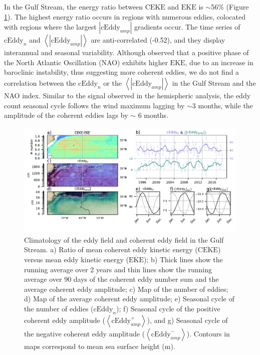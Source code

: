 \documentclass[draft,linenumbers]{agujournal2019}
\newcommand{\MEKE}{\overline{\textrm{EKE}}}
\newcommand{\EKE}{\textrm{EKE}}
\newcommand{\MCEKE}{\overline{\textrm{CEKE}}}
\newcommand{\CEKE}{\textrm{CEKE}}
\newcommand{\cEddy}{\textrm{cEddy}}
\begin{document}
	In the Gulf Stream, the energy ratio between $\CEKE$ and $\EKE$ is $\sim$56\% (Figure \ref{fig:Gulf_Stream}). 
	The highest energy ratio occurs in regions with numerous eddies, colocated with regions where the largest $|\cEddy_{amp}|$ gradients occur. 
	The time series of $\cEddy_{n}$ and $\left<|\cEddy_{amp}|\right>$ are anti-correlated (-0.52), and they display interannual and seasonal variability. 
	Although \citet{Chaudhuri_Oscillation_2009} observed that a positive phase of the North Atlantic Oscillation (NAO) exhibits higher $\EKE$, due to an increase in baroclinic instability, thus suggesting more coherent eddies, we do not find a correlation between the $\cEddy_{n}$ or the $\left<|\cEddy_{amp}|\right>$ in the Gulf Stream and the NAO index. 
	Similar to the signal observed in the hemispheric analysis, the eddy count seasonal cycle follows the wind maximum lagging by $\sim$3 months, while the amplitude of the coherent eddies lags by $\sim$ 6 months. 

	\begin{figure}
	    \centering
	    \includegraphics[width=1\textwidth]{figures/regional_ratios_and_stats_V3_5.pdf}
	    \caption{Climatology of the eddy field and coherent eddy field in the Gulf Stream. a) Ratio of mean coherent eddy kinetic energy ($\MCEKE$) versus mean eddy kinetic energy ($\MEKE$); b) Thick lines show the running average over 2 years and thin lines show the running average over 90 days of the coherent eddy number sum and the average coherent eddy amplitude; c) Map of the number of eddies; d) Map of the average coherent eddy amplitude; e) Seasonal cycle of the number of eddies ($\cEddy_n$); f) Seasonal cycle of the positive coherent eddy amplitude ($\left<\cEddy_{amp}^+\right>$), and g) Seasonal cycle of the negative coherent eddy amplitude ($\left<\cEddy_{amp}^-\right>$). Contours in maps correspond to mean sea surface height (m).}
	    \label{fig:Gulf_Stream}
	\end{figure}
\end{document}
